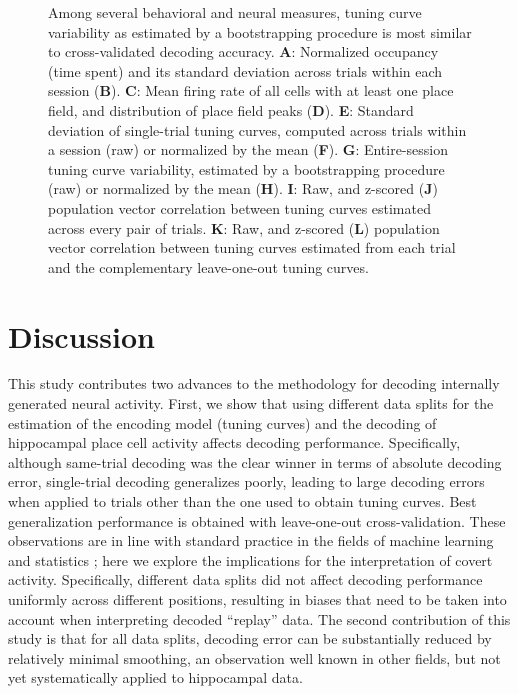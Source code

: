 \documentclass[11pt]{article}
\newcommand{\bsf}[1]{\textbf{#1}}
\let\cite=\citep
\begin{document}
\begin{figure}[h]
  \centering
  \caption{Among several behavioral and neural measures, tuning curve
    variability as estimated by a bootstrapping procedure is most
    similar to cross-validated decoding accuracy. \bsf{A}: Normalized
    occupancy (time spent) and its standard deviation across trials
    within each session (\bsf{B}). \bsf{C}: Mean firing rate of all
    cells with at least one place field, and distribution of place
    field peaks (\bsf{D}). \bsf{E}: Standard deviation of single-trial
    tuning curves, computed across trials within a session (raw) or
    normalized by the mean (\bsf{F}). \bsf{G}: Entire-session tuning
    curve variability, estimated by a bootstrapping procedure (raw) or
    normalized by the mean (\bsf{H}). \bsf{I}: Raw, and z-scored
    (\bsf{J}) population vector correlation between tuning curves
    estimated across every pair of trials. \bsf{K}: Raw, and z-scored
    (\bsf{L}) population vector correlation between tuning curves
    estimated from each trial and the complementary leave-one-out
    tuning curves.}
  \label{fig:behavTuning}
\end{figure}

\section*{Discussion}

This study contributes two advances to the methodology for decoding
internally generated neural activity. First, we show that using
different data splits for the estimation of the encoding model (tuning
curves) and the decoding of hippocampal place cell activity affects
decoding performance. Specifically, although same-trial decoding was
the clear winner in terms of absolute decoding error, single-trial
decoding generalizes poorly, leading to large decoding errors when
applied to trials other than the one used to obtain tuning
curves. Best generalization performance is obtained with leave-one-out
cross-validation. These observations are in line with standard
practice in the fields of machine learning and statistics
\cite{bishop2006pattern}; here we explore the implications for the
interpretation of covert activity. Specifically, different data splits
did not affect decoding performance uniformly across different
positions, resulting in biases that need to be taken into account when
interpreting decoded ``replay'' data. The second contribution of this
study is that for all data splits, decoding error can be substantially
reduced by relatively minimal smoothing, {\color{red} an observation
  well known in other fields, but not yet systematically applied to
  hippocampal data.}
\end{document}
